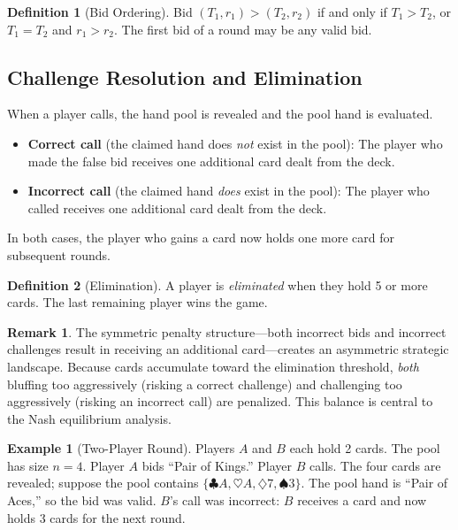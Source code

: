 \documentclass[11pt, a4paper]{article}
\theoremstyle{definition}
\newtheorem{definition}{Definition}
\newtheorem{example}{Example}
\newtheorem{remark}{Remark}
\begin{document}
\begin{definition}[Bid Ordering]
Bid $(T_1, r_1) > (T_2, r_2)$ if and only if $T_1 > T_2$, or $T_1 = T_2$ and
$r_1 > r_2$. The first bid of a round may be any valid bid.
\end{definition}

\subsection{Challenge Resolution and Elimination}

When a player calls, the hand pool is revealed and the pool hand is evaluated.

\begin{itemize}
    \item \textbf{Correct call} (the claimed hand does \emph{not} exist in the pool):
          The player who made the false bid receives one additional card dealt from
          the deck.
    \item \textbf{Incorrect call} (the claimed hand \emph{does} exist in the pool):
          The player who called receives one additional card dealt from the deck.
\end{itemize}

In both cases, the player who gains a card now holds one more card for subsequent rounds.

\begin{definition}[Elimination]
A player is \emph{eliminated} when they hold 5 or more cards. The last remaining
player wins the game.
\end{definition}

\begin{remark}
The symmetric penalty structure---both incorrect bids and incorrect challenges result
in receiving an additional card---creates an asymmetric strategic landscape. Because
cards accumulate toward the elimination threshold, \emph{both} bluffing too aggressively
(risking a correct challenge) and challenging too aggressively (risking an incorrect
call) are penalized. This balance is central to the Nash equilibrium analysis.
\end{remark}

\begin{example}[Two-Player Round]
Players $A$ and $B$ each hold 2 cards. The pool has size $n=4$. Player $A$ bids
``Pair of Kings.'' Player $B$ calls. The four cards are revealed; suppose the pool
contains $\{\clubsuit A, \heartsuit A, \diamondsuit 7, \spadesuit 3\}$. The pool hand
is ``Pair of Aces,'' so the bid was valid. $B$'s call was incorrect: $B$ receives a
card and now holds 3 cards for the next round.
\end{example}
\end{document}
